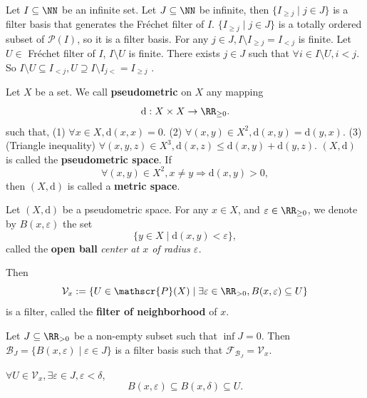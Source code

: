 \begin{exampleenv}
    Let $I\subseteq \NN$ be an infinite set. Let $J\subseteq \NN$ be infinite, then $\{I_{\ge j}\mid j\in J \}$ is a filter basis that generates the Fréchet filter of $I$. $\{I_{\ge j}\mid j\in J\}$ is a totally ordered subset of $\mathscr{P}(I)$, so it is a filter basis. For any $j\in J, I\setminus I_{\ge j}=I_{<j}$ is finite. Let $U\in $ Fréchet filter of $I$, $I\setminus U$ is finite. There exists $j\in J$ such that $\forall i\in I\setminus U,i<j$. So $I\setminus U\subseteq I_{<j}, U\supseteq I\setminus I_{j<}=I_{\ge j}$ .
\end{exampleenv}
\begin{exampleenv}
    Let $X$ be a set. We call \textbf{pseudometric} on $X$ any mapping
    $$\mathrm{d}: X\times X\to \RR_{\ge 0}.$$ 
    such that,
    \newline
    (1) $\forall x\in X, \mathrm{d}(x,x)=0.$
    \newline
    (2) $\forall (x,y)\in X^2, \mathrm{d}(x,y)=\mathrm{d}(y,x)$.
    \newline
    (3) (Triangle inequality) $\forall (x,y,z)\in X^3, \mathrm{d}(x,z)\le \mathrm{d}(x,y)+\mathrm{d}(y,z).$
    \newline
    $(X,\mathrm{d})$ is called the \textbf{pseudometric space}. If $$\forall (x,y)\in X^2,x\not=y\Rightarrow \mathrm{d}(x,y)>0,$$ then $(X,\mathrm{d})$ is called a \textbf{metric space}.

    Let $(X,\mathrm{d})$ be a pseudometric space. For any $x\in X$, and $\varepsilon\in \RR_{\ge 0}$, we denote by $B(x,\varepsilon)$ the set 
    $$\{y\in X\mid \mathrm{d}(x,y)<\varepsilon\},$$
    called the \textbf{open ball} \textit{center at $x$ of radius $\varepsilon$.} 
    
    Then  
    $$\mathcal{V}_x:=\{U\in \mathscr{P}(X)\mid \exists \varepsilon\in \RR_{>0}, B(x,\varepsilon)\subseteq U\}$$
    is a filter, called the \textbf{filter of neighborhood} of $x$.
\end{exampleenv}
\begin{propositionenv}
    Let $J\subseteq \RR_{>0}$ be a non-empty subset such that $\inf J=0$. Then $\mathcal{B}_J=\{B(x,\varepsilon)\mid \varepsilon\in J\}$ is a filter basis such that $\mathcal{F}_{\mathcal{B}_J}=\mathcal{V}_x$.
\end{propositionenv}
\begin{proofenv}
    $\forall U\in \mathcal{V}_x,\exists \varepsilon\in J,\varepsilon<\delta$,
    $$B(x,\varepsilon)\subseteq B(x,\delta)\subseteq U.$$
\end{proofenv}
